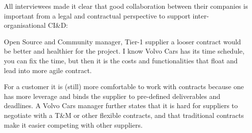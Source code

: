 All interviewees made it clear that good collaboration between their companies is important from a legal and contractual perspective to support inter-organisational CI\&D:

\begin{aquote}{Open Source and Community manager, Tier-1 supplier}
a looser contract would be better and healthier for the project. I know Volvo Cars has its time schedule, you can fix the time, but then it is the costs and functionalities that float and lead into more agile contract.
\end{aquote}



 For a customer it is (still) more comfortable to work with contracts because one has more leverage and binds the supplier to pre-defined deliverables and deadlines. A Volvo Cars manager %
further states that it is hard for suppliers to negotiate with a T\&M or other flexible contracts, and that traditional contracts make it easier competing with other suppliers.



